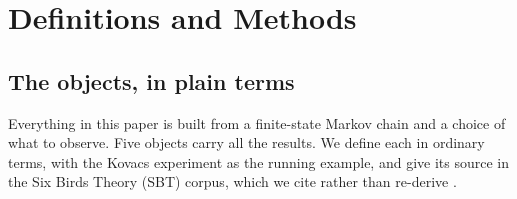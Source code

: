 \section{Definitions and Methods}
\label{sec:methods}

\subsection{The objects, in plain terms}

Everything in this paper is built from a finite-state Markov chain and a choice of what to
observe. Five objects carry all the results. We define each in ordinary terms, with the Kovacs
experiment as the running example, and give its source in the Six Birds Theory (SBT) corpus,
which we cite rather than re-derive .

